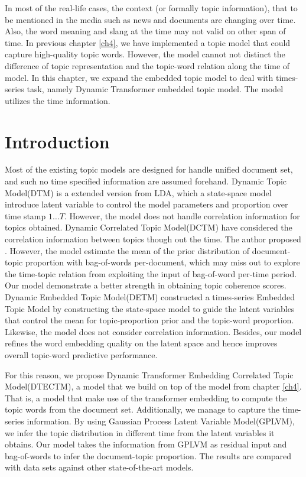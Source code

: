 In most of the real-life cases, the context (or formally topic information), that to be mentioned in the media such as news and documents are changing over time. Also, the word meaning and slang at the time may not valid on other span of time.
In previous chapter \ref{ch4}, we have implemented a topic model that could capture high-quality topic words. However, the model cannot not distinct the difference of topic representation and the topic-word relation along the time of model.
In this chapter, we expand the embedded topic model to deal with times-series task, namely Dynamic Transformer embedded topic model. The model utilizes the time information.
\section{Introduction}
Most of the existing topic models are designed for handle unified document set, and such no time specified information are assumed forehand. 
Dynamic Topic Model(DTM)\cite{blei_dynamic_2006} is a extended version from LDA, which a state-space model introduce latent variable to control the model parameters and proportion over time stamp $ 1\dots T $. However, the model does not handle correlation information for topics obtained.
Dynamic Correlated Topic Model(DCTM)\cite{tomasi_stochastic_nodate} have considered the correlation information between topics though out the time. The author proposed . However, the model estimate the mean of the prior distribution of document-topic proportion with bag-of-words per-document, which may miss out to explore the time-topic relation from exploiting the input of bag-of-word per-time period. Our model demonstrate a better strength in obtaining topic coherence scores.
Dynamic Embedded Topic Model(DETM)\cite{dieng_dynamic_2019} constructed a times-series Embedded Topic Model by constructing the state-space model to guide the latent variables that control the mean for topic-proportion prior and the topic-word proportion. Likewise, the model does not consider correlation information. Besides, our model refines the word embedding quality on the latent space and hence improves overall topic-word predictive performance.

For this reason, we propose Dynamic Transformer Embedding Correlated Topic Model(DTECTM), a model that we build on top of the model from chapter \ref{ch4}. That is, a model that make use of the transformer embedding to compute the topic words from the document set. Additionally, we manage to capture the time-series information. By using Gaussian Process Latent Variable Model(GPLVM), we infer the topic distribution in different time from the latent variables it obtains. Our model takes the information from GPLVM as residual input and bag-of-words to infer the document-topic proportion. The results are compared with data sets against other state-of-the-art models.
